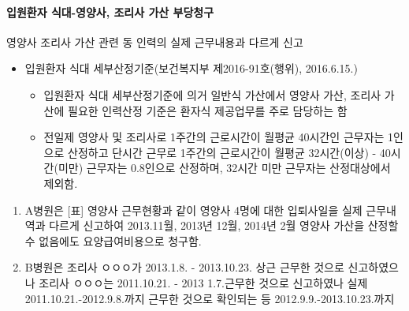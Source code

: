 \paragraph{입원환자 식대-영양사, 조리사 가산 부당청구}\par
\begin{commentbox}{영양사 조리사 가산 관련 동 인력의 실제 근무내용과 다르게 신고}
\begin{description}\tightlist
\item[관련근거] 
\begin{itemize}\tightlist
\item 입원환자 식대 세부산정기준(보건복지부 제2016-91호(행위), 2016.6.15.) 
	\begin{itemize}\tightlist
	\item 입원환자 식대 세부산정기준에 의거 일반식 가산에서 영양사 가산, 조리사 가산에 필요한 인력산정 기준은 환자식 제공업무를 주로 담당하는 함
	\item 전일제 영양사 및 조리사로 1주간의 근로시간이 월평균 40시간인 근무자는 1인으로 산정하고 단시간 근무로 1주간의 근로시간이 월평균 32시간(이상) - 40시간(미만) 근무자는 0.8인으로 산정하며, 32시간 미만 근무자는 산정대상에서 제외함.
	\end{itemize}
\end{itemize}
\item[부당사례]
\begin{enumerate}[1)]\tightlist
\item A병원은 [표] 영양사 근무현황과 같이 영양사 4명에 대한 입\cntrdot{}퇴사일을 실제 근무내역과 다르게 신고하여 2013.11월, 2013년 12월, 2014년 2월 영양사 가산을 산정할 수 없음에도 요양급여비용으로 청구함.
\item B병원은 조리사 ㅇㅇㅇ가 2013.1.8. - 2013.10.23. 상근 근무한 것으로 신고하였으나  조리사 ㅇㅇㅇ는 2011.10.21. - 2013 1.7.근무한 것으로 신고하였나 실제 2011.10.21.-2012.9.8.까지 근무한 것으로 확인되는 등 2012.9.9.-2013.10.23.까지 
\end{enumerate}
\end{description}


\end{commentbox}
